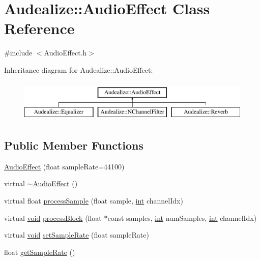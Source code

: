 \hypertarget{class_audealize_1_1_audio_effect}{}\section{Audealize\+:\+:Audio\+Effect Class Reference}
\label{class_audealize_1_1_audio_effect}


{\ttfamily \#include $<$Audio\+Effect.\+h$>$}

Inheritance diagram for Audealize\+:\+:Audio\+Effect\+:\begin{figure}[H]
\begin{center}
\leavevmode
\includegraphics[height=2.000000cm]{class_audealize_1_1_audio_effect}
\end{center}
\end{figure}
\subsection*{Public Member Functions}
\begin{DoxyCompactItemize}
\item 
\hyperlink{class_audealize_1_1_audio_effect_ac730d3e11025310b13019073268174de}{Audio\+Effect} (float sample\+Rate=44100)
\item 
virtual \hyperlink{class_audealize_1_1_audio_effect_a3cd9fc8ee2b2bb4bd313772014651fd0}{$\sim$\+Audio\+Effect} ()
\item 
virtual float \hyperlink{class_audealize_1_1_audio_effect_ab77548a457702d189087163a696d4215}{process\+Sample} (float sample, \hyperlink{tk_8h_a83f82f76e7fed06f4c49d2db94028a6d}{int} channel\+Idx)
\item 
virtual \hyperlink{tk_8h_aba408b7cd755a96426e004c015f5de8e}{void} \hyperlink{class_audealize_1_1_audio_effect_a343c4a44c067e2605d18dcb578ae1302}{process\+Block} (float $\ast$const samples, \hyperlink{tk_8h_a83f82f76e7fed06f4c49d2db94028a6d}{int} num\+Samples, \hyperlink{tk_8h_a83f82f76e7fed06f4c49d2db94028a6d}{int} channel\+Idx)
\item 
virtual \hyperlink{tk_8h_aba408b7cd755a96426e004c015f5de8e}{void} \hyperlink{class_audealize_1_1_audio_effect_a5ff34c0371f2311dc026bca5ba245faa}{set\+Sample\+Rate} (float sample\+Rate)
\item 
float \hyperlink{class_audealize_1_1_audio_effect_aa1d51c95f452a5d71f97908a13751166}{get\+Sample\+Rate} ()
\end{DoxyCompactItemize}
